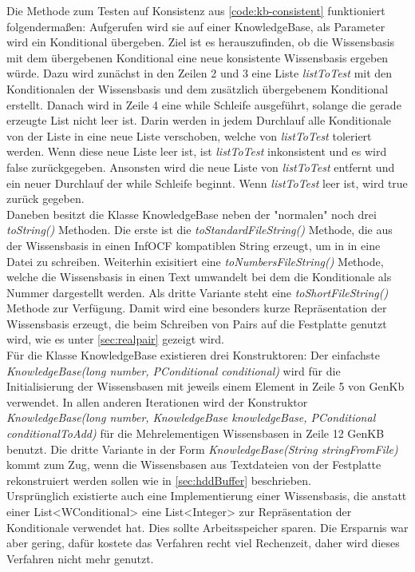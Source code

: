\documentclass[12pt,a4paper]{article}
\begin{document}
Die Methode zum Testen auf Konsistenz aus \autoref{code:kb-consistent} funktioniert folgendermaßen: Aufgerufen wird sie auf einer KnowledgeBase, als Parameter wird ein Konditional übergeben. Ziel ist es herauszufinden, ob die Wissensbasis mit dem übergebenen Konditional eine neue konsistente Wissensbasis ergeben würde. Dazu wird zunächst in den Zeilen 2 und 3 eine Liste \textit{listToTest} mit den Konditionalen der Wissensbasis und dem zusätzlich übergebenem Konditional erstellt. Danach wird in Zeile 4 eine while Schleife ausgeführt, solange die gerade erzeugte List nicht leer ist. Darin werden in jedem Durchlauf alle Konditionale von der Liste in eine neue Liste verschoben, welche von \textit{listToTest} toleriert werden. Wenn diese neue Liste leer ist, ist \textit{listToTest} inkonsistent und es wird false zurückgegeben. Ansonsten wird die neue Liste von \textit{listToTest} entfernt und ein neuer Durchlauf der while Schleife beginnt. Wenn \textit{listToTest} leer ist, wird true zurück gegeben. \\
Daneben besitzt die Klasse KnowledgeBase neben der "normalen" noch drei \textit{toString()} Methoden. Die erste ist die \textit{toStandardFileString()} Methode, die aus der Wissensbasis in einen InfOCF kompatiblen String erzeugt, um in in eine Datei zu schreiben. Weiterhin exisitiert eine \textit{toNumbersFileString()} Methode, welche die Wissensbasis in einen Text umwandelt bei dem die Konditionale als Nummer dargestellt werden. Als dritte Variante steht eine \textit{toShortFileString()} Methode zur Verfügung. Damit wird eine besonders kurze Repräsentation der Wissensbasis erzeugt, die beim Schreiben von Pairs auf die Festplatte genutzt wird, wie es unter \autoref{sec:realpair} gezeigt wird. \\
Für die Klasse KnowledgeBase existieren drei Konstruktoren: Der einfachste \textit{KnowledgeBase(long number, PConditional conditional)} wird für die Initialisierung der Wissensbasen mit jeweils einem Element in Zeile 5 von GenKb verwendet. In allen anderen Iterationen wird der Konstruktor \textit{KnowledgeBase(long number, KnowledgeBase knowledgeBase, PConditional conditionalToAdd)} für die Mehrelementigen Wissensbasen in Zeile 12 GenKB benutzt. Die dritte Variante in der Form \textit{KnowledgeBase(String stringFromFile)} kommt zum Zug, wenn die Wissensbasen aus Textdateien von der Festplatte rekonstruiert werden sollen wie in \autoref{sec:hddBuffer} beschrieben. \\
Ursprünglich existierte auch eine Implementierung einer Wissensbasis, die anstatt einer List<WConditional> eine List<Integer> zur Repräsentation der Konditionale verwendet hat. Dies sollte Arbeitsspeicher sparen. Die Ersparnis war aber gering, dafür kostete das Verfahren recht viel Rechenzeit, daher wird dieses Verfahren nicht mehr genutzt.
\end{document}
